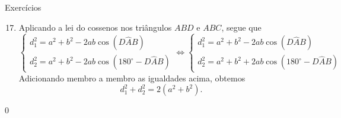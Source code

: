 \begin{answer}{Exercícios}
{\exerciselist
\begin{enumerate}\setcounter{enumi}{16}
\item Aplicando a lei do cossenos nos triângulos $ABD$ e $ABC$, segue que
    $$\begin{cases}
    d_1^2=a^2+b^2-2ab\cos(D\hat{A}B)\\
    d_2^2=a^2+b^2-2ab\cos(180^\circ-D\hat{A}B)
    \end{cases} \iff
    \begin{cases}
    d_1^2=a^2+b^2-2ab\cos(D\hat{A}B)\\
    d_2^2=a^2+b^2+2ab\cos(180^\circ-D\hat{A}B)
    \end{cases} 
    $$
    Adicionando membro a membro as igualdades acima, obtemos 
    $$d_1^2+d_2^2=2(a^2+b^2).$$
\end{enumerate}
}{0}
\end{answer}
\clearmargin
